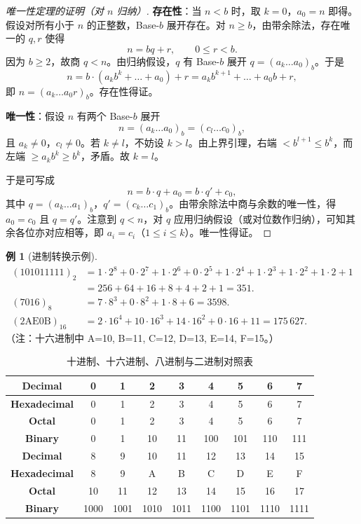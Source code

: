 \documentclass[UTF8,11pt,a4paper]{ctexbook}   %
\theoremstyle{definition}
\newtheorem{example}{例}[section]
\begin{document}
\begin{proof}[唯一性定理的证明（对 $n$ 归纳）]
\textbf{存在性}：当 $n<b$ 时，取 $k=0$，$a_0=n$ 即得。假设对所有小于 $n$ 的正整数，Base-$b$ 展开存在。对 $n\ge b$，由带余除法，存在唯一的 $q,r$ 使得
\[
n = bq + r,\qquad 0\le r < b.
\]
因为 $b\ge 2$，故商 $q < n$。由归纳假设，$q$ 有 Base-$b$ 展开 $q = (a_k\dots a_0)_b$。于是
\[
n = b\cdot(a_k b^k + \dots + a_0) + r = a_k b^{k+1} + \dots + a_0 b + r,
\]
即 $n = (a_k\dots a_0 r)_b$。存在性得证。

\textbf{唯一性}：假设 $n$ 有两个 Base-$b$ 展开
\[
n = (a_k\dots a_0)_b = (c_l\dots c_0)_b,
\]
且 $a_k\neq 0$，$c_l\neq 0$。若 $k\neq l$，不妨设 $k>l$。由上界引理，右端 $< b^{l+1}\le b^k$，而左端 $\ge a_k b^k \ge b^k$，矛盾。故 $k=l$。

于是可写成
\[
n = b\cdot q + a_0 = b\cdot q' + c_0,
\]
其中 $q = (a_k\dots a_1)_b$，$q' = (c_k\dots c_1)_b$。由带余除法中商与余数的唯一性，得 $a_0=c_0$ 且 $q=q'$。注意到 $q<n$，对 $q$ 应用归纳假设（或对位数作归纳），可知其余各位亦对应相等，即 $a_i=c_i$（$1\le i\le k$）。唯一性得证。
\end{proof}

\begin{example}[进制转换示例]
\begin{align*}
(101011111)_2 &= 1\cdot 2^8 + 0\cdot 2^7 + 1\cdot 2^6 + 0\cdot 2^5 + 1\cdot 2^4 + 1\cdot 2^3 + 1\cdot 2^2 + 1\cdot 2 + 1 \\
&= 256+64+16+8+4+2+1 = 351.\\[0.5em]
(7016)_8 &= 7\cdot 8^3 + 0\cdot 8^2 + 1\cdot 8 + 6 = 3598.\\[0.5em]
(2\text{A}\text{E}0\text{B})_{16} &= 2\cdot 16^4 + 10\cdot 16^3 + 14\cdot 16^2 + 0\cdot 16 + 11 = 175\,627.
\end{align*}
（注：十六进制中 A=10, B=11, C=12, D=13, E=14, F=15。）
\end{example}

\begin{table}[htbp]
\centering
\caption{十进制、十六进制、八进制与二进制对照表}
\begin{tabular}{|c|c|c|c|c|c|c|c|c|}
\hline
\textbf{Decimal} & 0 & 1 & 2 & 3 & 4 & 5 & 6 & 7 \\
\hline
\textbf{Hexadecimal} & 0 & 1 & 2 & 3 & 4 & 5 & 6 & 7 \\
\hline
\textbf{Octal} & 0 & 1 & 2 & 3 & 4 & 5 & 6 & 7 \\
\hline
\textbf{Binary} & 0 & 1 & 10 & 11 & 100 & 101 & 110 & 111 \\
\hline
\hline
\textbf{Decimal} & 8 & 9 & 10 & 11 & 12 & 13 & 14 & 15 \\
\hline
\textbf{Hexadecimal} & 8 & 9 & A & B & C & D & E & F \\
\hline
\textbf{Octal} & 10 & 11 & 12 & 13 & 14 & 15 & 16 & 17 \\
\hline
\textbf{Binary} & 1000 & 1001 & 1010 & 1011 & 1100 & 1101 & 1110 & 1111 \\
\hline
\end{tabular}
\end{table}
\end{document}
